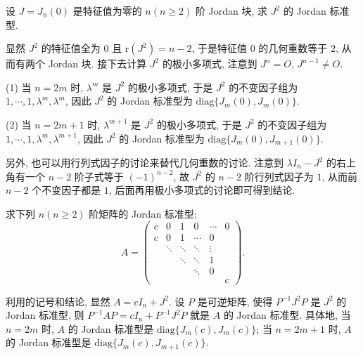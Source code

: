 \documentclass[../../main.tex]{subfiles}%
\begin{document}
\begin{example}\label{example:J_n(0)的Jordan标准型}
设 $J = J_n(0)$ 是特征值为零的 $n(n \geqslant  2)$ 阶 Jordan 块, 求 $J^2$ 的 Jordan 标准型.
\end{example}
\begin{solution}

显然 $J^2$ 的特征值全为 $0$ 且 $\mathrm{r}(J^2) = n - 2$, 于是特征值 $0$ 的几何重数等于 $2$, 从而有两个 Jordan 块. 接下去计算 $J^2$ 的极小多项式, 注意到 $J^n = O$, $J^{n - 1} \neq O$.

(1) 当 $n = 2m$ 时, $\lambda^m$ 是 $J^2$ 的极小多项式, 于是 $J^2$ 的不变因子组为 $1,\cdots,1,\lambda^m,\lambda^m$, 因此 $J^2$ 的 Jordan 标准型为 $\mathrm{diag}\{J_m(0),J_m(0)\}$.

(2) 当 $n = 2m + 1$ 时, $\lambda^{m + 1}$ 是 $J^2$ 的极小多项式, 于是 $J^2$ 的不变因子组为 $1,\cdots,1,\lambda^m,\lambda^{m + 1}$, 因此 $J^2$ 的 Jordan 标准型为 $\mathrm{diag}\{J_m(0),J_{m + 1}(0)\}$.

另外, 也可以用行列式因子的讨论来替代几何重数的讨论. 注意到 $\lambda I_n - J^2$ 的右上角有一个 $n - 2$ 阶子式等于 $(-1)^{n - 2}$, 故 $J^2$ 的 $n - 2$ 阶行列式因子为 $1$, 从而前 $n - 2$ 个不变因子都是 $1$, 后面再用极小多项式的讨论即可得到结论.

\end{solution}

\begin{example}
求下列 $n(n \geqslant  2)$ 阶矩阵的 Jordan 标准型:
\[
A = \begin{pmatrix}
c & 0 & 1 & 0 & \cdots & 0 \\
c & 0 & 1 & \cdots & 0 \\
& \ddots & \ddots & \ddots & \vdots \\
& & \ddots & \ddots & 1 \\
& & & \ddots & 0 \\
& & & & & c
\end{pmatrix}.
\]
\end{example}
\begin{solution}

利用的记号和结论, 显然 $A = cI_n + J^2$. 设 $P$ 是可逆矩阵, 使得 $P^{-1}J^2P$ 是 $J^2$ 的 Jordan 标准型, 则 $P^{-1}AP = cI_n + P^{-1}J^2P$ 就是 $A$ 的 Jordan 标准型. 具体地, 当 $n = 2m$ 时, $A$ 的 Jordan 标准型是 $\mathrm{diag}\{J_m(c),J_m(c)\}$; 当 $n = 2m + 1$ 时, $A$ 的 Jordan 标准型是 $\mathrm{diag}\{J_m(c),J_{m + 1}(c)\}$.

\end{solution}
\end{document}
